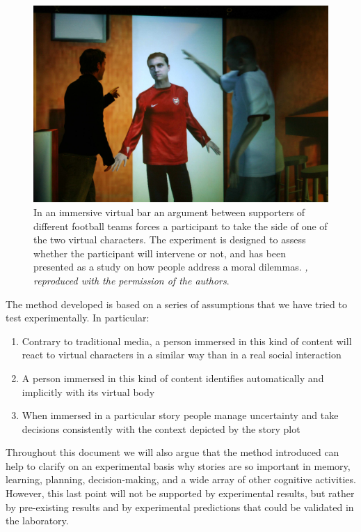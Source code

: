 \documentclass[
		twoside,openright,titlepage,numbers=noenddot,manychapters,
		headinclude,%
                footinclude=false,cleardoublepage=empty,
                BCOR=5mm,
		fontsize=11pt, %
                 enabledeprecatedfontcommands]{scrreprt}
\begin{document}
\begin{figure}[h!]
\begin{center}
\includegraphics[width=12cm]{figures/bystander01.jpg}
\caption{ In an immersive virtual bar an argument between supporters of different football teams forces a participant to take the side of one of the two virtual characters. The experiment is designed to assess whether the participant will intervene or not, and has been presented as a study on how people address a moral dilemmas.   \emph{\cite{rovira2009use}, reproduced with the permission of the authors}.  }
\label{fig_rovira}
\end{center}
\end{figure}


The method developed is based on a series of assumptions that we have tried to test experimentally. In particular:
 \begin{enumerate}
   \item Contrary to traditional media, a person immersed in this kind of content will react to virtual characters in a similar way than in a real social interaction
   \item A person immersed in this kind of content identifies automatically and implicitly with its virtual body
   \item When immersed in a particular story  people manage uncertainty and take decisions consistently with the context depicted by the story plot
\end{enumerate}

Throughout this document we will also argue that the method introduced can help to clarify on an experimental basis why stories are so important in  memory, learning, planning, decision-making, and a wide array of other cognitive activities. However, this last point will not be supported by experimental results, but rather by pre-existing results and by  experimental predictions that could be validated in the laboratory.
\end{document}
